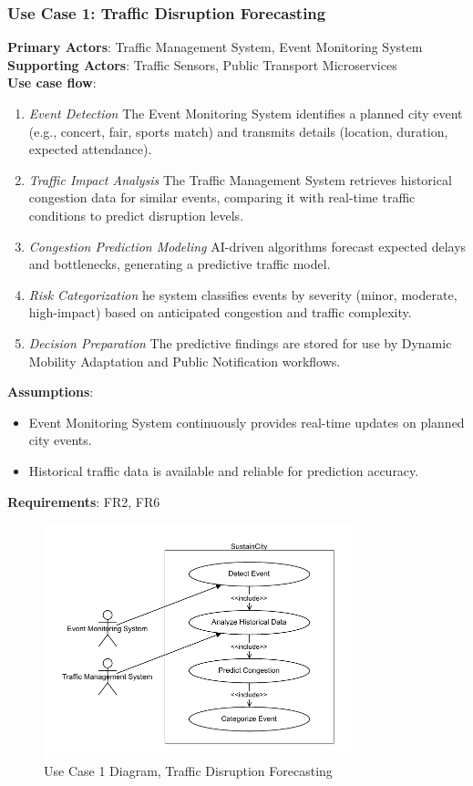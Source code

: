 \documentclass[a4paper,12pt]{article}
\begin{document}
\subsubsection*{Use Case 1: Traffic Disruption Forecasting}
\textbf{Primary Actors}: Traffic Management System, Event Monitoring System \\
\textbf{Supporting Actors}: Traffic Sensors, Public Transport Microservices \\
\textbf{Use case flow}: 
\begin{enumerate}
    \item \textit{Event Detection} The Event Monitoring System identifies a planned city event (e.g., concert, fair, sports match) and transmits details (location, duration, expected attendance).
    \item \textit{Traffic Impact Analysis} The Traffic Management System retrieves historical congestion data for similar events, comparing it with real-time traffic conditions to predict disruption levels.
    \item \textit{Congestion Prediction Modeling} AI-driven algorithms forecast expected delays and bottlenecks, generating a predictive traffic model.
    \item \textit{Risk Categorization} he system classifies events by severity (minor, moderate, high-impact) based on anticipated congestion and traffic complexity.
    \item \textit{Decision Preparation} The predictive findings are stored for use by Dynamic Mobility Adaptation and Public Notification workflows.
\end{enumerate}
\textbf{Assumptions}: 
\begin{itemize}
    \item Event Monitoring System continuously provides real-time updates on planned city events.
    \item Historical traffic data is available and reliable for prediction accuracy.
\end{itemize}
\textbf{Requirements}: FR2, FR6
\\
\begin{figure}[h]
    \centering
    \includegraphics[width=0.8\textwidth]{diagrams/Traffic_Disruption_Forecasting.drawio.pdf}
    \caption{Use Case 1 Diagram, Traffic Disruption Forecasting}
    \label{fig:Traffic_Disruption_Forecasting.drawio}
\end{figure}
\\
\end{document}

